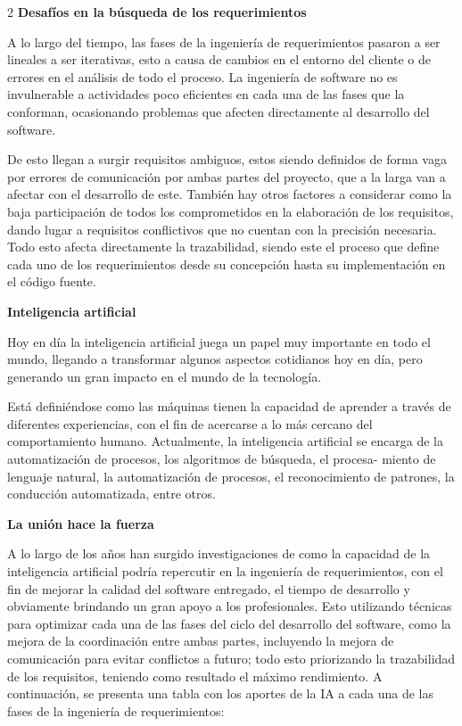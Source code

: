 \documentclass[12pt,spanish,Letterpaper,openany]{book}
\begin{document}
\begin {multicols}{2}
\textbf{Desafíos en la búsqueda de los requerimientos }

A lo largo del tiempo, las fases de la ingeniería de requerimientos pasaron a ser lineales a ser iterativas, esto a causa de cambios en el entorno del cliente o de errores en el análisis de todo el proceso. La ingeniería de software no es invulnerable a actividades poco eficientes en cada una de las fases que la conforman, ocasionando problemas que afecten directamente al desarrollo del software.

De esto llegan a surgir requisitos ambiguos, estos siendo definidos de forma vaga por errores de comunicación por ambas partes del proyecto, que a la larga van a afectar con el desarrollo de este. También hay otros factores a considerar como la baja participación de todos los comprometidos en la elaboración de los requisitos, dando lugar a requisitos conflictivos que no cuentan con la precisión necesaria. Todo esto afecta directamente la trazabilidad, siendo este el
proceso que define cada uno de los requerimientos desde su concepción hasta su implementación en el código fuente.

\textbf{Inteligencia artificial}

Hoy en día la inteligencia artificial juega un papel muy importante en todo el mundo, llegando a transformar algunos aspectos cotidianos hoy en día, pero generando un gran impacto en el mundo de la tecnología.

Está definiéndose como las máquinas tienen la capacidad de aprender a través de diferentes experiencias, con el fin de acercarse a lo más cercano del comportamiento humano. Actualmente, la inteligencia artificial se encarga de la automatización de procesos, los algoritmos de búsqueda, el procesa-
miento de lenguaje natural, la automatización de procesos, el reconocimiento de patrones, la conducción automatizada, entre otros.

\textbf{La unión hace la fuerza}

A lo largo de los años han surgido investigaciones de como la capacidad de la inteligencia artificial podría repercutir en la ingeniería de requerimientos, con el fin de mejorar la calidad del software entregado, el tiempo de desarrollo y obviamente brindando un gran apoyo a los profesionales. Esto utilizando técnicas para optimizar cada una de las fases del ciclo del desarrollo del software, como la mejora de la coordinación entre ambas partes, incluyendo la mejora de comunicación para evitar conflictos a futuro; todo esto priorizando la trazabilidad de los requisitos, teniendo como resultado el máximo rendimiento. A continuación, se presenta una tabla con los aportes de la IA a cada una de las fases de la ingeniería de requerimientos:


\end{multicols}
\end{document}
